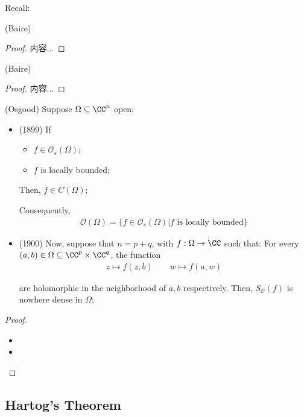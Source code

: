 \documentclass[Total.tex]{subfiles}
\begin{document}
			Recall:
			\begin{theorem}
				(Baire)
			\end{theorem}
			\begin{proof}
				内容...
			\end{proof}
			
			\begin{corollary}
				(Baire)
			\end{corollary}
			\begin{proof}
				内容...
			\end{proof}
			\begin{theorem}
				(Osgood) Suppose $\Omega\subseteq \CC^n$ open;
				\begin{itemize}
					\item (1899) If 
					\begin{itemize}
						\item $f\in \mathcal{O}_s(\Omega)$;
						\item $f$ is locally bounded;
					\end{itemize}
					
					Then, $f\in C(\Omega)$;
					
					Consequently, 
					\begin{gather*}
						\mathcal{O}(\Omega)=\{f\in \mathcal{O}_s(\Omega)|f\mbox{ is locally bounded}\}
					\end{gather*}
					\item (1900) Now, suppose that $n=p+q$, with $f:\Omega\rightarrow \CC$ such that: For every $(a,b)\in \Omega\subseteq \CC^p\times \CC^q$, the function
					\begin{gather*}
						z\mapsto f(z,b)\qquad w\mapsto f(a,w)
					\end{gather*}
					
					are holomorphic in the neighborhood of $a,b$ respectively. Then, $S_\mathcal{O}(f)$ is nowhere dense in $\Omega$;
				\end{itemize}
			\end{theorem}
			\begin{proof}
				\begin{itemize}
					\item 
					\item 
				\end{itemize}
			\end{proof}
		\subsection{Hartog's Theorem}
		
\end{document}
